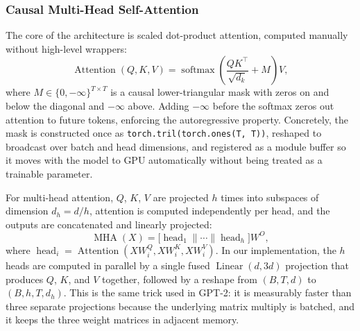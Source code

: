 \subsubsection{Causal Multi-Head Self-Attention}
The core of the architecture is scaled dot-product attention, computed
manually without high-level wrappers:
\begin{equation}
\operatorname{Attention}(Q, K, V) =
\operatorname{softmax}\!\left(\frac{QK^\top}{\sqrt{d_k}} + M\right) V,
\label{eq:attention}
\end{equation}
where $M \in \{0, -\infty\}^{T \times T}$ is a causal lower-triangular
mask with zeros on and below the diagonal and $-\infty$ above. Adding
$-\infty$ before the softmax zeros out attention to future tokens,
enforcing the autoregressive property. Concretely, the mask is
constructed once as
\texttt{torch.tril(torch.ones(T, T))}, reshaped to broadcast over batch
and head dimensions, and registered as a module buffer so it moves with
the model to GPU automatically without being treated as a trainable
parameter.

\noindent For multi-head attention, $Q$, $K$, $V$ are projected $h$ times into
subspaces of dimension $d_h = d/h$, attention is computed independently
per head, and the outputs are concatenated and linearly projected:
\begin{equation}
\operatorname{MHA}(X) =
\bigl[\operatorname{head}_1 \| \cdots \| \operatorname{head}_h\bigr] W^O,
\label{eq:mha}
\end{equation}
where $\operatorname{head}_i = \operatorname{Attention}(XW^Q_i, XW^K_i, XW^V_i)$.
In our implementation, the $h$ heads are computed in parallel by a single
fused $\operatorname{Linear}(d, 3d)$ projection that produces $Q$, $K$,
and $V$ together, followed by a reshape from $(B, T, d)$ to
$(B, h, T, d_h)$. This is the same trick used in GPT-2: it is measurably
faster than three separate projections because the underlying matrix
multiply is batched, and it keeps the three weight matrices in adjacent
memory.

